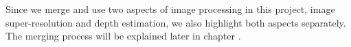 Since we merge and use two aspects of image processing in this project, image super-resolution and depth estimation, we also highlight both aspects separately.
The merging process will be explained later in chapter
.
